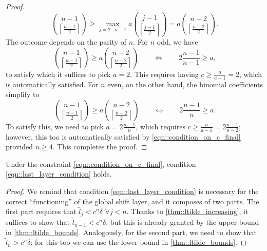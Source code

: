 \begin{proof}
    \begin{equation}
        \binom{n-1}{\left\lceil\frac{n-1}{2}\right\rceil} \geq \max_{j=2\dots n-1}a\binom{j-1}{\left\lceil\frac{j-1}{2}\right\rceil}=a\binom{n-2}{\left\lceil\frac{n-2}{2}\right\rceil}.
    \end{equation}   
    The outcome depends on the parity of $n$. For $n$ odd, we have
    \begin{equation}
        \binom{n-1}{\left\lceil\frac{n-1}{2}\right\rceil} \geq a\binom{n-2}{\left\lceil\frac{n-2}{2}\right\rceil}
        \qquad\Longleftrightarrow\qquad 2\frac{n-1}{n-1}\geq a,
    \end{equation}   
    to satisfy which it suffices to pick $a=2$. This requires having $c\geq\frac{a}{a-1}=2$, which is automatically satisfied. For $n$ even, on the other hand, the binomial coefficients simplify to
    \begin{equation}
        \binom{n-1}{\left\lceil\frac{n-1}{2}\right\rceil} \geq a\binom{n-2}{\left\lceil\frac{n-2}{2}\right\rceil}
        \qquad\Longleftrightarrow\qquad 2\frac{n-1}{n}\geq a.
    \end{equation}   
    To satisfy this, we need to pick $a=2\frac{n-1}{n}$, which requires $c\geq\frac{a}{a-1}=2\frac{n-1}{n-2}$; however, this too is automatically satisfied by \cref{eqn::condition_on_c_final} provided $n\geq4$. This completes the proof.
\end{proof}


\begin{lemma}
    Under the constraint \cref{eqn::condition_on_c_final}, condition \cref{eqn::last_layer_condition} holds.
\end{lemma}
\begin{proof}
    We remind that condition \cref{eqn::last_layer_condition} is necessary for the correct ``functioning'' of the global shift layer, and it composes of two parts.
    The first part requires that $\tilde{l}_{j}<c^n\delta$ $\forall j<n$. Thanks to \cref{thm::ltilde_increasing}, it suffices to show that $\tilde{l}_{n-1}<c^n\delta$, but this is already granted by the upper bound in \cref{thm::ltilde_bounds}. Analogously, for the second part, we need to show that $\tilde{l}_n>c^n\delta$: for this too we can use the lower bound in \cref{thm::ltilde_bounds}.    
\end{proof}

